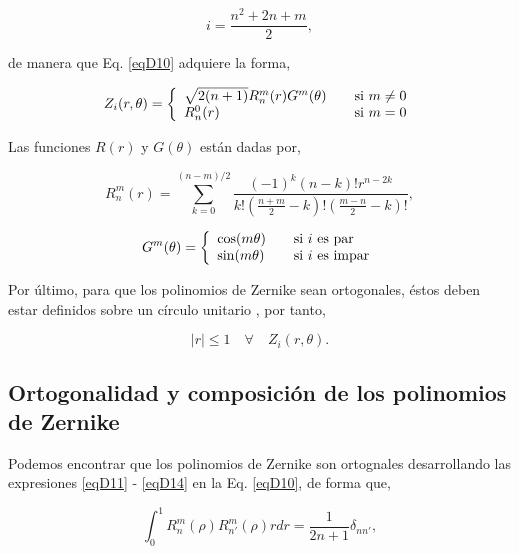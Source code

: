 \begin{equation}
\label{eqD11}
	i = \frac{n^2+2n+m}{2},
\end{equation}

de manera que Eq. \ref{eqD10} adquiere la forma,

\begin{equation}
	Z_i (r,\theta) = \left\{
	\begin{array}{l l}
		\sqrt{2(n+1)}R^{m}_{n}(r)G^{m}(\theta) & \quad \text{si $m\neq 0$} \\
		R^{0}_n(r) & \quad \text{si $m = 0$}
	\end{array} \right.
\end{equation}

Las funciones $R(r)$ y $G(\theta)$ están dadas por,

\begin{equation}
\label{eqD12}
	R^m_n(r) = \sum^{(n-m)/2}_{k=0} \frac{(-1)^k(n-k)!r^{n-2k}}{k!(\frac{n+m}{2}-k)!(\frac{m-n}{2}-k)!},
\end{equation}

\begin{equation}
\label{eqD13}
	G^m(\theta) = \left\{
	\begin{array}{l l}
		\cos(m\theta) & \quad \text{si $i$ es par}\\
		\sin(m\theta) & \quad \text{si $i$ es impar}
	\end{array} \right.
\end{equation}

Por último, para que los polinomios de Zernike sean ortogonales, éstos deben estar definidos sobre un círculo unitario \cite{Dai2008}, por tanto,

\begin{equation}
\label{eqD14}
	|r| \leq 1 \quad \forall \quad Z_i(r,\theta).
\end{equation}

\subsection{Ortogonalidad y composición de los polinomios de Zernike}
\label{subsec:ortogonalidad}


Podemos encontrar que los polinomios de Zernike son ortognales desarrollando las expresiones \ref{eqD11} - \ref{eqD14} en la Eq. \ref{eqD10}, de forma que,

\begin{equation}
\label{eqD15}
	\int_{0}^{1} R^{m}_n(\rho) R^m_{n'}(\rho) r dr = \frac{1}{2n+1} \delta_{nn'},
\end{equation}


